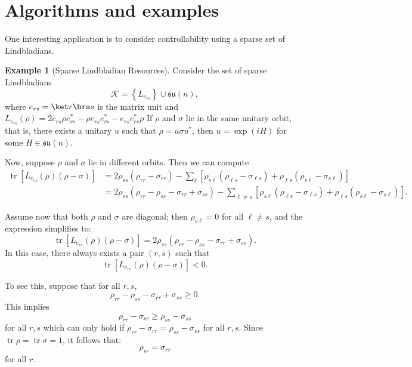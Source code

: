 \documentclass[11pt,reqno]{amsart}
\theoremstyle{definition}
\newtheorem{example}[theorem]{Example}
\newcommand{\mc}{\mathcal}
\newcommand{\mf}{\mathfrak}
\newcommand{\lset}{\left\{ }
\newcommand{\rset}{\right\} }
\newcommand{\lbra}{\left[}
\newcommand{\rbra}{\right]}
\DeclareMathOperator{\tr}{tr}
\begin{document}
\section{Algorithms and examples}\label{alg}
One interesting application is to consider controllability using a sparse set of Lindbladians.
\begin{example}[Sparse Lindbladian Resources]
    Consider the set of sparse Lindbladians \cite{childs2016} $$\mc K = \lset L_{e_{rs}}\rset \cup \mf{su}(n),$$ where $e_{rs}=\ket r\bra s$ is the matrix unit and $L_{e_{rs}}(\rho) = 2 e_{rs} \rho e^*_{rs} - \rho e_{rs} e^*_{rs} - e_{rs} e^*_{rs} \rho$
    If $\rho$ and $\sigma$ lie in the same unitary orbit, that is, there exists a unitary $u$ such that $\rho = u\sigma u^*$, then $u = \exp(iH)$ for some $H\in\mf{su}(n)$.
    
    Now, suppose $\rho$ and $\sigma$ lie in different orbits. Then we can compute
    \begin{equation*}
    \begin{aligned}
        \tr\lbra L_{e_{rs}}(\rho)(\rho - \sigma) \rbra
        &= 2\rho_{ss}(\rho_{rr} - \sigma_{rr}) - \sum_\ell \lbra\rho_{s\ell}(\rho_{\ell s} - \sigma_{\ell s}) + \rho_{\ell s}(\rho_{s\ell} - \sigma_{s\ell})\rbra \\
        &= 2\rho_{ss}(\rho_{rr} - \rho_{ss} - \sigma_{rr} + \sigma_{ss}) - \sum_{\ell \ne s} \lbra\rho_{s\ell}(\rho_{\ell s} - \sigma_{\ell s}) + \rho_{\ell s}(\rho_{s\ell} - \sigma_{s\ell})\rbra.
    \end{aligned}
    \end{equation*}
    
    
    Assume now that both $\rho$ and $\sigma$ are diagonal; then $\rho_{s\ell} = 0$ for all $\ell \ne s$, and the expression simplifies to:
    $$\tr\lbra L_{e_{rs}}(\rho)(\rho - \sigma) \rbra = 2\rho_{ss}(\rho_{rr} - \rho_{ss} - \sigma_{rr} + \sigma_{ss}).$$
    In this case, there always exists a pair $(r, s)$ such that
    $$\tr\lbra L_{e_{rs}}(\rho)(\rho - \sigma) \rbra < 0.$$
    
    To see this, suppose that for all $r, s$,
    $$\rho_{rr} - \rho_{ss} - \sigma_{rr} + \sigma_{ss} \geq 0.$$
    This implies
    $$\rho_{rr} - \sigma_{rr} \geq \rho_{ss} - \sigma_{ss}$$
    for all $r,s$
    which can only hold if $\rho_{rr} - \sigma_{rr} = \rho_{ss} - \sigma_{ss}$ for all $r, s$. Since $\tr \rho = \tr \sigma = 1$, it follows that:
    $$\rho_{rr} = \sigma_{rr}$$
    for all $r$.
\end{example}
\end{document}
